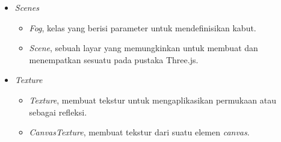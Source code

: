 \begin{itemize}
\item \textit{Scenes}

	\begin{itemize}
	\item {\it Fog}, kelas yang berisi parameter untuk mendefinisikan kabut.
	\item {\it Scene}, sebuah layar yang memungkinkan untuk membuat dan menempatkan sesuatu pada pustaka Three.js. 
	\end{itemize}
	
\item \textit{Texture}
	\begin{itemize}
	\item {\it Texture}, membuat tekstur untuk mengaplikasikan permukaan atau sebagai refleksi.
	\item {\it CanvasTexture}, membuat tekstur dari suatu elemen {\it canvas}.
	\end{itemize}	
	
\end{itemize}
 
